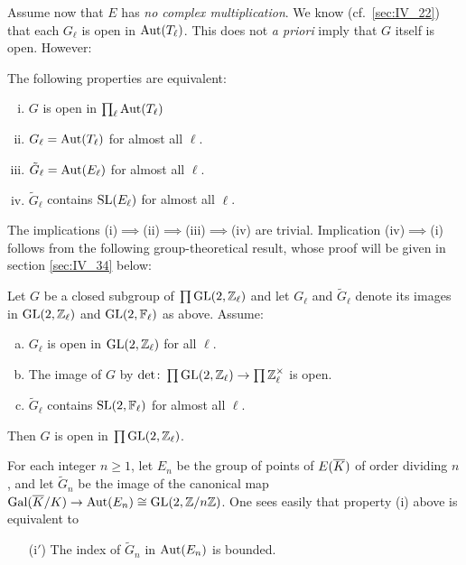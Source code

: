 Assume now that $E$ has \emph{no complex multiplication}. We know (cf.\
\ref{sec:IV_22}) that each $G_\ell$ is open in $\operatorname{Aut}(T_\ell)$. This does not
\emph{a priori} imply that $G$ itself is open. However:

\begin{prop}
The following properties are equivalent:
\begin{enumerate}[(i)]
	\item $G$ is open in $\prod_\ell \operatorname{Aut}(T_\ell)$
	\item $G_\ell = \operatorname{Aut}(T_\ell)$ for almost all $\ell$.
	\item $\tilde{G}_\ell = \operatorname{Aut}(E_\ell)$ for almost all $\ell$.
	\item $\tilde{G}_\ell$ contains $\operatorname{SL}(E_\ell)$ for almost all $\ell$.
\end{enumerate}
\end{prop}

The implications (i)$\implies$(ii)$\implies$(iii)$\implies$(iv) are trivial.
Implication (iv)$\implies$(i) follows from the following group-theoretical
result, whose proof will be given in section \ref{sec:IV_34} below:

\begin{lem}\label{lem:IV_31_main}
Let $G$ be a closed subgroup of $\prod \operatorname{GL}(2, \mathbb{Z}_\ell)$ and 
let $G_\ell$ and $\tilde{G}_\ell$ denote its images in $\operatorname{GL}(2, \mathbb{Z}_\ell)$ and
$\operatorname{GL}(2, \mathbb{F}_\ell)$ as above. Assume:
\begin{enumerate}[(a)]
	\item\label{lem:IV_31_main_a}
		$G_\ell$ is open in $\operatorname{GL}(2, \mathbb{Z}_\ell)$ for all $\ell$.
	\item\label{lem:IV_31_main_b}
		The image of $G$ by $\det \colon \prod \operatorname{GL}(2, \mathbb{Z}_\ell) \to \prod
\mathbb{Z}^\times_\ell$ is open.
	\item\label{lem:IV_31_main_c}
		$\widetilde{G}_\ell$\label{errata:widetilde_Gl} contains
		$\operatorname{SL}(2,\mathbb{F}_\ell)$ for almost all $\ell$.
\end{enumerate}
Then $G$ is open in $\prod \operatorname{GL}(2, \mathbb{Z}_\ell)$.
\end{lem}

\begin{obs}
For each integer $n \geq 1$, let $E_n$ be the group of points of $E(\overline{K})$
of order dividing $n$, and let $\tilde{G}_n$ be the image of the canonical map
$\operatorname{Gal}(\overline{K}/K) \to \operatorname{Aut}(E_n) \cong \operatorname{GL}(2, \mathbb{Z} / n\mathbb{Z})$.
One sees easily that property (i) above is equivalent to 
\begin{enumerate}
	\item[(i$'$)] The index of $\tilde{G}_n$ in $\operatorname{Aut}(E_n)$ is bounded.
\end{enumerate}
\end{obs}

